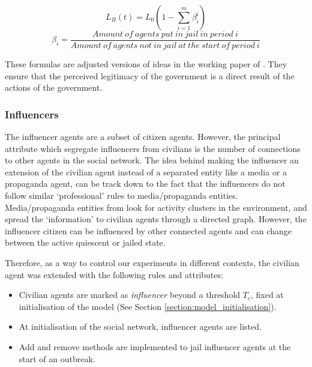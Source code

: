 \documentclass[10pt]{article}
\begin{document}
    \begin{equation}
        L_B(t) = L_0(1- \sum\limits_{i = 1}^{m} \beta^i_i)
    \end{equation}
    \begin{equation}
        \beta_i = \frac{Amount\ of\ agents\ put\ in\ jail\ in\ period\ i}{Amount\ of\ agents\ not\ in\ jail\ at\ the\ start\ of\ period\ i}
    \end{equation}

    These formulas are adjusted versions of ideas in the working paper of \cite{epstein2001modeling}. They ensure that the perceived legitimacy of the government is a direct result of the actions of the government.


    \subsubsection{Influencers}
    \label{section:influencer_entity}

    The influencer agents are a subset of citizen agents. However, the principal attribute which segregate influencers from civilians is the number of connections to other agents in the social network. The idea behind making the influencer an extension of the civilian agent instead of a separated entity like a media or a propaganda agent, can be track down to the fact that the influencers do not follow similar `professional' rules to media/propaganda entities. Media/propaganda entities from \citet{lemos2015} look for activity clusters in the environment, and spread the `information' to civilian agents through a directed graph. However, the influencer citizen can be influenced by other connected agents and can change between the active quiescent or jailed state.

    Therefore, as a way to control our experiments in different contexts, the civilian agent was extended with the following rules and attributes:
    \begin{itemize}
        \item Civilian agents are marked as \emph{influencer} beyond a threshold $T_c$, fixed at initialisation of the model (See Section \ref{section:model_initialisation}).
        \item At initialisation of the social network, influencer agents are listed.
        \item Add and remove methods are implemented to jail influencer agents at the start of an outbreak.
    \end{itemize}
\end{document}
